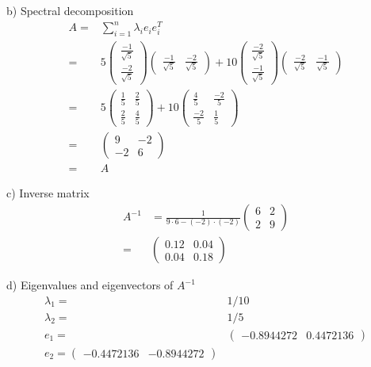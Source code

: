 \documentclass[a4paper,10pt]{article}
\begin{document}
 b) Spectral decomposition\\
 \begin{align*}
  A = & \sum_{i=1}^n \lambda_i e_i e_i^T\\
  = & 5 \begin{pmatrix} \frac{-1}{\sqrt{5}} \\ \frac{-2}{\sqrt{5}} \end{pmatrix} \begin{pmatrix} \frac{-1}{\sqrt{5}} & \frac{-2}{\sqrt{5}} \end{pmatrix} + 10 \begin{pmatrix} \frac{-2}{\sqrt{5}} \\ \frac{-1}{\sqrt{5}} \end{pmatrix} \begin{pmatrix} \frac{-2}{\sqrt{5}} & \frac{-1}{\sqrt{5}} \end{pmatrix} \\
  = & 5 \begin{pmatrix} \frac{1}{5} & \frac{2}{5} \\ \frac{2}{5} & \frac{4}{5} \end{pmatrix} + 10 \begin{pmatrix} \frac{4}{5} & \frac{-2}{5} \\ \frac{-2}{5} & \frac{1}{5} \end{pmatrix}\\
  = & \begin{pmatrix} 9 & -2 \\ -2 & 6 \end{pmatrix} \\
  = & A
 \end{align*}
 
 c) Inverse matrix\\
 \begin{align*}
  A^{-1} & = \frac{1}{9 \cdot 6 - (-2) \cdot (-2)} \begin{pmatrix} 6 & 2 \\ 2 & 9 \end{pmatrix}\\
  = & \begin{pmatrix} 0.12 & 0.04 \\ 0.04 & 0.18 \end{pmatrix}
 \end{align*}

 d) Eigenvalues and eigenvectors of $A^{-1}$
 \begin{align*}
  \lambda_1 = & 1/10\\
  \lambda_2 = & 1/5\\
  e_1 = & \begin{pmatrix}  - 0.8944272 & 0.4472136 \end{pmatrix}\\
  e_2 = \begin{pmatrix}  -0.4472136 & - 0.8944272 \end{pmatrix}
 \end{align*}
\end{document}
